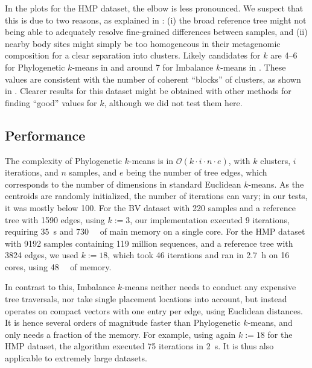 In the plots for the \ac{HMP} dataset, the elbow is less pronounced.
We suspect that this is due to two reasons, as explained in :
(i) the broad reference tree might not being able to adequately resolve fine-grained differences between samples,
and (ii) nearby body sites might simply be too homogeneous in their metagenomic composition for a clear separation into clusters.
Likely candidates for $k$ are \num{4}--\num{6} for Phylogenetic $k$-means in 
and around \num{7} for Imbalance $k$-means in .
These values are consistent with the number of coherent ``blocks'' of clusters,
as shown in .
Clearer results for this dataset might be obtained with other methods for finding ``good'' values for $k$,
although we did not test them here.


\subsection{Performance}
\label{ch:Clustering:sec:Results:sub:Performance}

The complexity of Phylogenetic $k$-means is in $\mathcal{O}(k \cdot i \cdot n \cdot e)$,
with $k$ clusters, $i$ iterations, and $n$ samples, and $e$ being the number of tree edges,
which corresponds to the number of dimensions in standard Euclidean $k$-means.
As the centroids are randomly initialized, the number of iterations can vary;
in our tests, it was mostly below \num{100}.
For the \ac{BV} dataset with \num{220} samples and a reference tree with \num{1 590} edges, using $k:=3$,
our implementation executed \num{9} iterations, requiring \SI{35}{\second} and \SI{730}{\mega\byte} of main memory on a single core.
For the \ac{HMP} dataset with \num{9 192} samples containing \num{119} million sequences,
and a reference tree with \num{3 824} edges, we used $k:=18$,
which took \num{46} iterations and ran in \SI{2.7}{\hour} on \num{16} cores, using \SI{48}{\giga\byte} of memory.

In contrast to this, Imbalance $k$-means neither needs to conduct any expensive tree traversals,
nor take single placement locations into account,
but instead operates on compact vectors with one entry per edge, using Euclidean distances.
It is hence several orders of magnitude faster than Phylogenetic $k$-means, and only needs a fraction of the memory.
For example, using again $k:=18$ for the \ac{HMP} dataset,
the algorithm executed \num{75} iterations in \SI{2}{\second}.
It is thus also applicable to extremely large datasets.

